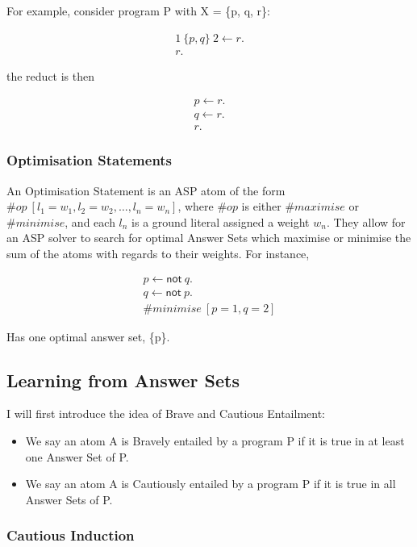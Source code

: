 For example, consider program P with X = \{p, q, r\}:

\begin{align*}
1 \: \{p, q\} \: 2 \gets r. \\
r.
\end{align*}

the reduct is then

\begin{align*}
p \gets r. \\
q \gets r. \\
r.
\end{align*}

\subsubsection{Optimisation Statements}

An Optimisation Statement is an ASP atom of the form $ \#op \: [l_1 = w_1, l_2 = w_2, \dots, l_n = w_n]$, where $\#op$ is either $\#maximise$ or $\#minimise$, and each $l_n$ is a ground literal assigned a weight $w_n$. They allow for an ASP solver to search for optimal Answer Sets which maximise or minimise the sum of the atoms with regards to their weights. For instance, 

\begin{align*}
p \gets \textsf{not} \: q. \\
q \gets \textsf{not} \: p. \\
\#minimise \: [p = 1, q = 2]
\end{align*}

Has one optimal answer set, \{p\}.

\subsection{Learning from Answer Sets}

I will first introduce the idea of Brave and Cautious Entailment:

\begin{itemize}
\item We say an atom A is Bravely entailed by a program P if it is true in at least one Answer Set of P.
\item We say an atom A is Cautiously entailed by a program P if it is true in all Answer Sets of P.
\end{itemize}

\subsubsection{Cautious Induction}

